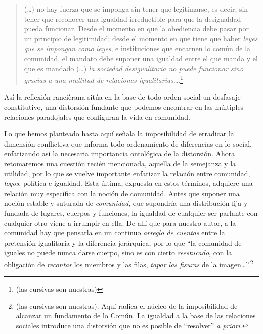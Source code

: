 \begin{quote}
(\ldots) no hay fuerza que se imponga sin tener que legitimarse, es decir, sin tener que reconocer una igualdad irreductible para que la desigualdad pueda funcionar. Desde el momento en que la obediencia debe pasar por un principio de legitimidad; desde el momento en que tiene que haber \emph{leyes que se impongan como leyes}, e instituciones que encarnen lo común de la comunidad, el mandato debe suponer una igualdad entre el que manda y el que es mandado (\ldots) \emph{la sociedad desigualitaria no puede funcionar sino gracias a una multitud de relaciones igualitarias}\ldots.\footnote{\cite[][72-73]{@7066-RANCIERE2007} (las cursivas son nuestras)}
\end{quote}

Así la reflexión rancièrana sitúa en la base de todo orden social un desfasaje constitutivo, una distorsión fundante que podemos encontrar en las múltiples relaciones paradojales que configuran la vida en comunidad.

Lo que hemos planteado hasta aquí señala la imposibilidad de erradicar la dimensión conflictiva que informa todo ordenamiento de diferencias en lo social, enfatizando así la necesaria importancia ontológica de la distorsión. Ahora retomaremos una cuestión recién mencionada, aquella de la semejanza y la utilidad, por lo que se vuelve importante enfatizar la relación entre comunidad, \emph{logos}, política e igualdad. Esta última, expuesta en estos términos, adquiere una relación muy específica con la noción de comunidad. Antes que suponer una noción estable y suturada de \emph{comunidad}, que supondría una distribución fija y fundada de lugares, cuerpos y funciones, la igualdad de cualquier ser parlante con cualquier otro viene a irrumpir en ella. De allí que para nuestro autor, a la comunidad hay que pensarla en un continuo \emph{arreglo de cuentas} entre la pretensión igualitaria y la diferencia jerárquica, por lo que \enquote{la comunidad de iguales no puede nunca darse cuerpo, sino es con cierto \emph{reestucado}, con la obligación de \emph{recontar} los miembros y las filas, \emph{tapar las fisuras} de la imagen\ldots}.\footnote{\cite[][50]{@7065-RANCIERE2007} (las cursivas son nuestras). Aquí radica el núcleo de la imposibilidad de alcanzar un fundamento de lo Común. La igualdad a la base de las relaciones sociales introduce una distorsión que no es posible de \enquote{resolver} \emph{a priori}.}

